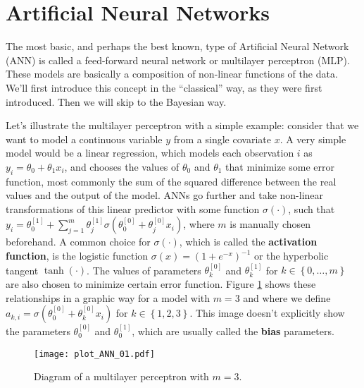 
\section{Artificial Neural Networks}

The most basic, and perhaps the best known, type of Artificial Neural Network (ANN) is called a feed-forward neural network or multilayer perceptron (MLP). These models are basically a composition of non-linear functions of the data. We'll first introduce this concept in the ``classical'' way, as they were first introduced. Then we will skip to the Bayesian way.

Let's illustrate the multilayer perceptron with a simple example: consider that we want to model a continuous variable $y$ from a single covariate $x$. A very simple model would be a linear regression, which models each observation $i$ as $y_i = \theta_0 + \theta_1 x_i$, and chooses the values of $\theta_0$ and $\theta_1$ that minimize some error function, most commonly the sum of the squared difference between the real values and the output of the model. ANNs go further and take non-linear transformations of this linear predictor with some function $\sigma(\cdot)$, such that $y_i = \theta_0^{[1]} +  \sum_{j = 1}^m \theta_j^{[1]} \sigma \left( \theta_0^{[0]} + \theta_j^{[0]} x_i \right)$, where $m$ is manually chosen beforehand. A common choice for $\sigma(\cdot)$, which is called the \textbf{activation function}, is the logistic function $\sigma(x) = (1 + e^{-x})^{-1}$
or the hyperbolic tangent $\tanh(\cdot)$. The values of parameters $\theta_k^{[0]}$ and $\theta_k^{[1]}$ for $k \in \left\{ 0, \ldots, m \right\}$ are also chosen to minimize certain error function. Figure \ref{fig:theory_ANN_diagram_01} shows these relationships in a graphic way for a model with $m = 3$ and where we define $a_{k, i} = \sigma \left( \theta_0^{[0]} + \theta_k^{[0]} x_i \right)$ for $k \in \left\{ 1, 2, 3 \right\}$.
This image doesn't explicitly show the parameters $\theta_0^{[0]}$ and $\theta_0^{[1]}$, which are usually called the \textbf{bias} parameters.

\begin{figure}[H]
    \centering
    \texttt{[image: plot\_ANN\_01.pdf]}
    \caption{Diagram of a multilayer perceptron with $m = 3$.}
    \label{fig:theory_ANN_diagram_01}
\end{figure}

